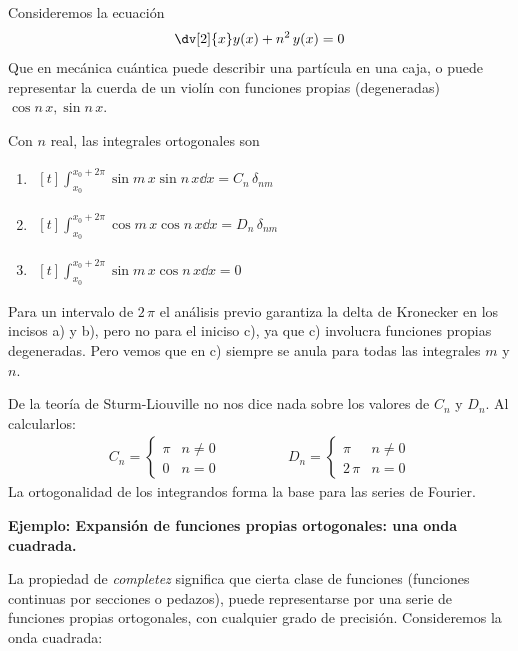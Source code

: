 Consideremos la ecuación 
\begin{align*}
\dv[2]{x} y(x) + n^{2} \, y(x) = 0
\end{align*}
Que en mecánica cuántica puede describir una partícula en una caja, o puede representar la cuerda de un violín con funciones propias (degeneradas) $\cos n \, x, \sin n \, x$.
\par
Con $n$ real, las integrales ortogonales son
\begin{enumerate}[label=\alph*)]
\item $\begin{aligned}[t] \int_{x_{0}}^{x_{0} + 2 \pi} \sin m \, x \sin n \, x \dd{x} = C_{n} \, \delta_{nm} \end{aligned} $ 
\item $\begin{aligned}[t] \int_{x_{0}}^{x_{0} + 2 \pi} \cos m \, x \cos n \, x \dd{x} = D_{n} \, \delta_{nm} \end{aligned} $ 
\item $\begin{aligned}[t] \int_{x_{0}}^{x_{0} + 2 \pi} \sin m \, x \cos n \, x \dd{x} = 0 \end{aligned} $
\end{enumerate}
Para un intervalo de $2 \, \pi$ el análisis previo garantiza la delta de Kronecker en los incisos a) y b), pero no para el iniciso c), ya que c) involucra funciones propias degeneradas. Pero vemos que en c) siempre se anula para todas las integrales $m$ y $n$.
\par
De la teoría de Sturm-Liouville no nos dice nada sobre los valores de $C_{n}$ y $D_{n}$. Al calcularlos:
\begin{align*}
C_{n} = \begin{cases}
\pi  & n \neq 0 \\
0  & n = 0 \end{cases}
\hspace{2cm}
D_{n} = \begin{cases}
\pi & n \neq 0 \\
2 \, \pi & n = 0 \end{cases}
\end{align*}
La ortogonalidad de los integrandos forma la base para las series de Fourier.
\par
\textbf{Ejemplo: Expansión de funciones propias ortogonales: una onda cuadrada.}
\par
La propiedad de \emph{completez} significa que cierta clase de funciones (funciones continuas por secciones o pedazos), puede representarse por una serie de funciones propias ortogonales, con cualquier grado de precisión. Consideremos la onda cuadrada:
